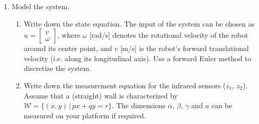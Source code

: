 \documentclass[10pt,a4paper]{article}
\begin{document}
\newpage
\begin{enumerate}
  \item Model the system.
  \begin{enumerate}
    \item Write down the state equation. The input of the system can be chosen as $u = \begin{bmatrix}v\\ \omega\end{bmatrix}$, where $\omega$ [rad/s] denotes the rotational velocity of the robot around its center point, and $v$ [m/s] is the robot's forward translational velocity (i.e. along its longitudinal axis). Use a forward Euler method to discretize the system.
    \item Write down the measurement equation for the infrared sensors ($z_1$, $z_2$). Assume that a (straight) wall is characterized by $\mathcal{W} = \{(x,y) \,|\, px+qy=r\}$. The dimensions $\alpha$, $\beta$, $\gamma$ and $a$ can be measured on your platform if required.
  \end{enumerate}


\end{enumerate}
\end{document}
